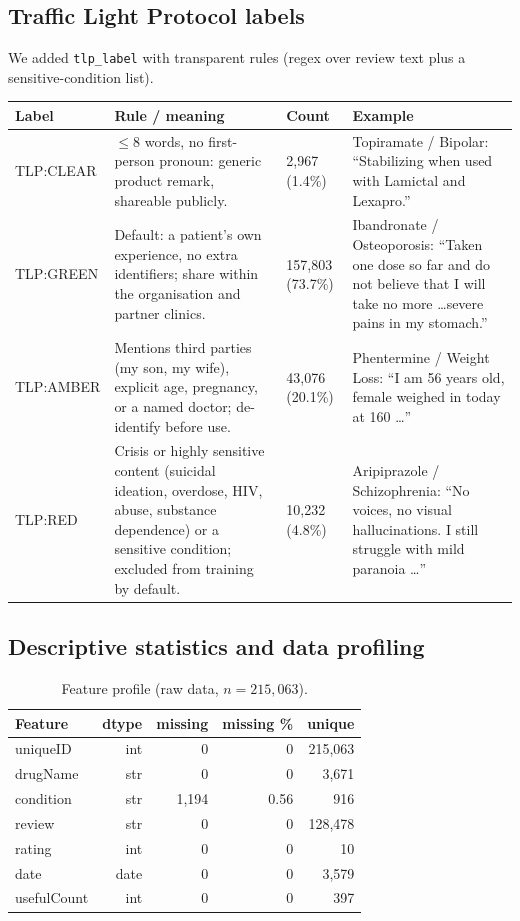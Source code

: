 \documentclass[11pt]{article}
\newcommand{\code}[1]{\texttt{#1}}
\begin{document}
\subsection{Traffic Light Protocol labels}
We added \code{tlp\_label} with transparent rules (regex over review text plus a sensitive-condition list).
\begin{table}[H]\centering\small
\begin{tabular}{p{2.1cm}p{4.2cm}p{1.5cm}p{6.5cm}}\toprule
Label & Rule / meaning & Count & Example \\\midrule
TLP:CLEAR & $\le 8$ words, no first-person pronoun: generic product remark, shareable publicly. & 2,967 (1.4\%) & Topiramate / Bipolar: ``Stabilizing when used with Lamictal and Lexapro.'' \\
TLP:GREEN & Default: a patient's own experience, no extra identifiers; share within the organisation and partner clinics. & 157,803 (73.7\%) & Ibandronate / Osteoporosis: ``Taken one dose so far and do not believe that I will take no more \ldots severe pains in my stomach.'' \\
TLP:AMBER & Mentions third parties (my son, my wife), explicit age, pregnancy, or a named doctor; de-identify before use. & 43,076 (20.1\%) & Phentermine / Weight Loss: ``I am 56 years old, female weighed in today at 160 \ldots'' \\
TLP:RED & Crisis or highly sensitive content (suicidal ideation, overdose, HIV, abuse, substance dependence) or a sensitive condition; excluded from training by default. & 10,232 (4.8\%) & Aripiprazole / Schizophrenia: ``No voices, no visual hallucinations. I still struggle with mild paranoia \ldots'' \\
\bottomrule\end{tabular}
\end{table}

\subsection{Descriptive statistics and data profiling}
\begin{table}[H]\centering\small
\caption{Feature profile (raw data, $n=215{,}063$).}
\begin{tabular}{lrrrr}\toprule
Feature & dtype & missing & missing \% & unique \\\midrule
uniqueID & int & 0 & 0 & 215,063 \\
drugName & str & 0 & 0 & 3,671 \\
condition & str & 1,194 & 0.56 & 916 \\
review & str & 0 & 0 & 128,478 \\
rating & int & 0 & 0 & 10 \\
date & date & 0 & 0 & 3,579 \\
usefulCount & int & 0 & 0 & 397 \\
\bottomrule\end{tabular}
\end{table}
\end{document}
